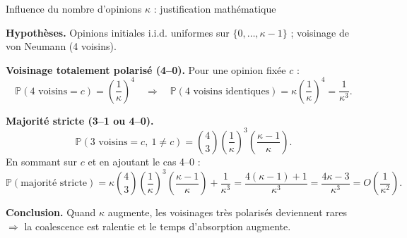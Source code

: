\documentclass{beamer}
\begin{document}
\begin{frame}{Influence du nombre d’opinions $\kappa$ : justification mathématique}

\footnotesize
\setlength{\abovedisplayskip}{4pt}
\setlength{\belowdisplayskip}{4pt}

\textbf{Hypothèses.}
Opinions initiales i.i.d. uniformes sur $\{0,\dots,\kappa-1\}$ ; voisinage de von Neumann (4 voisins).

\medskip
\textbf{Voisinage totalement polarisé (4--0).}
Pour une opinion fixée $c$ :
\[
\mathbb{P}(\text{4 voisins}=c)=\left(\frac{1}{\kappa}\right)^4
\quad\Rightarrow\quad
\mathbb{P}(\text{4 voisins identiques})=\kappa\left(\frac{1}{\kappa}\right)^4=\frac{1}{\kappa^3}.
\]

\medskip
\textbf{Majorité stricte (3--1 ou 4--0).}
\[
\mathbb{P}(\text{3 voisins}=c,\ 1\neq c)=\binom{4}{3}\left(\frac{1}{\kappa}\right)^3\left(\frac{\kappa-1}{\kappa}\right).
\]
En sommant sur $c$ et en ajoutant le cas 4--0 :
\[
\mathbb{P}(\text{majorité stricte})
=\kappa\binom{4}{3}\left(\frac{1}{\kappa}\right)^3\left(\frac{\kappa-1}{\kappa}\right)+\frac{1}{\kappa^3}
=\frac{4(\kappa-1)+1}{\kappa^3}=\frac{4\kappa-3}{\kappa^3}=O\!\left(\frac{1}{\kappa^2}\right).
\]

\medskip
\textbf{Conclusion.} Quand $\kappa$ augmente, les voisinages très polarisés deviennent rares $\Rightarrow$
la coalescence est ralentie et le temps d’absorption augmente.

\end{frame}
\end{document}
